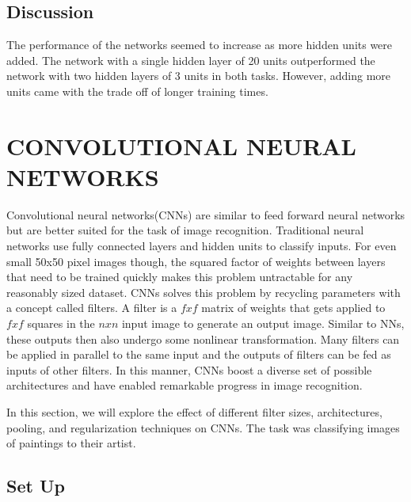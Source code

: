 \documentclass[10pt,twoside]{article}
\begin{document}
\subsection{Discussion}

The performance of the networks seemed to increase as more hidden units were added. The network with a single hidden layer of 20 units outperformed the network with two hidden layers of 3 units in both tasks. However, adding more units came with the trade off of longer training times. 


\section{\uppercase{Convolutional Neural Networks}}

\noindent Convolutional neural networks(CNNs) are similar to feed forward neural networks but are better suited for the task of image recognition. Traditional neural networks use fully connected layers and hidden units to classify inputs. For even small 50x50 pixel images though, the squared factor of weights between layers that need to be trained quickly makes this problem untractable for any reasonably sized dataset.  CNNs solves this problem by recycling parameters with a concept called filters. A filter is a $fxf$ matrix of weights that gets applied to $fxf$ squares in the $nxn$ input image to generate an output image. Similar to NNs, these outputs then also undergo some nonlinear transformation. Many filters can be applied in parallel to the same input and the outputs of filters can be fed as inputs of other filters. In this manner, CNNs boost a diverse set of possible architectures and have enabled remarkable progress in image recognition.

In this section, we will explore the effect of different filter sizes, architectures, pooling, and regularization techniques on CNNs. The task was classifying images of paintings to their artist.

\subsection{Set Up}
\end{document}
